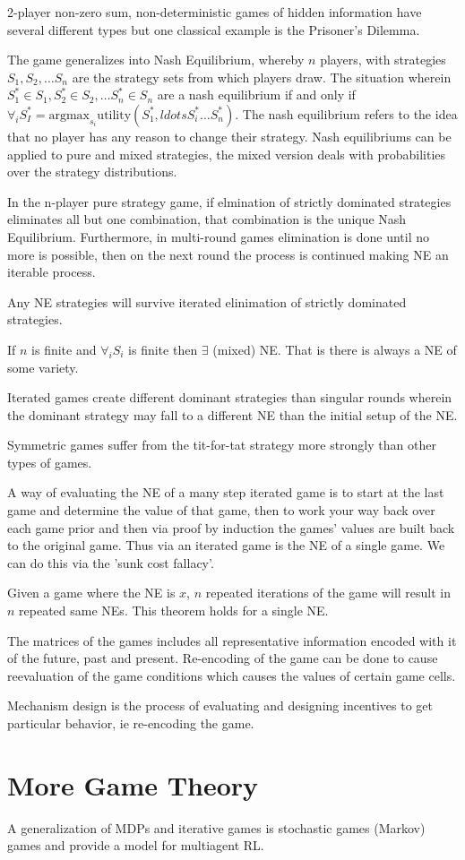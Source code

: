 \documentclass{article}
\begin{document}
2-player non-zero sum, non-deterministic games of hidden information have
several different types but one classical example is the Prisoner's Dilemma. 

The game generalizes into Nash Equilibrium, whereby $n$ players, with strategies
$S_1, S_2, \ldots S_n$ are the strategy sets from which players draw. The
situation wherein $S_1^* \in S_1, S_2^* \in S_2, \ldots S_n^* \in S_n$ are a
nash equilibrium if and only if $\forall_i S_I^* = \text{argmax}_{s_i} 
\text{utility}(S_1^*,ldots S_i^* \ldots S_n^*)$. The nash equilibrium refers to 
the idea that no player has any reason to change their strategy. Nash
equilibriums can be applied to pure and mixed strategies, the mixed version 
deals with probabilities over the strategy distributions. 

In the n-player pure strategy game, if elmination of strictly dominated 
strategies eliminates all but one combination, that combination is the 
unique Nash Equilibrium. Furthermore, in multi-round games elimination is 
done until no more is possible, then on the next round the process is continued
making NE an iterable process. 

Any NE strategies will survive iterated elinimation of strictly dominated 
strategies.

If $n$ is finite and $\forall_i S_i$ is finite then $\exists$ (mixed) NE. That
is there is always a NE of some variety. 

Iterated games create different dominant strategies than singular rounds 
wherein the dominant strategy may fall to a different NE than the initial 
setup of the NE. 

Symmetric games suffer from the tit-for-tat strategy more strongly than other
types of games.  

A way of evaluating the NE of a many step iterated game is to start 
at the last game and determine the value of that game, then to work your way
back over each game prior and then via proof by induction the games' values
are built back to the original game. Thus via an iterated game is the NE of a 
single game. We can do this via the 'sunk cost fallacy'. 

Given a game where the NE is $x$, $n$ repeated iterations of the game will 
result in $n$ repeated same NEs. This theorem holds for a single NE. 

The matrices of the games includes all representative information encoded with
it of the future, past and present. Re-encoding of the game can be done to 
cause reevaluation of the game conditions which causes the values of certain
game cells. 

Mechanism design is the process of evaluating and designing incentives to
get particular behavior, ie re-encoding the game. 

\section{More Game Theory}

A generalization of MDPs and iterative games is stochastic games (Markov) 
games and provide a model for multiagent RL. 
\end{document}
